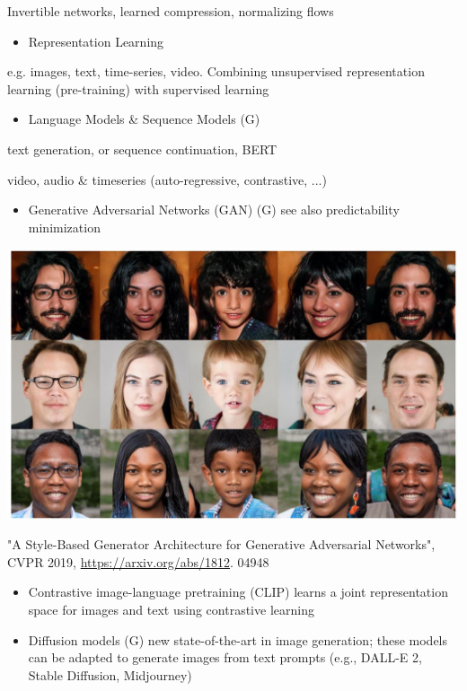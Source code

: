 \documentclass[10pt]{article}
\begin{document}
Invertible networks, learned compression, normalizing flows

\begin{itemize}
  \item Representation Learning
\end{itemize}

e.g. images, text, time-series, video. Combining unsupervised representation learning (pre-training) with supervised learning

\begin{itemize}
  \item Language Models \& Sequence Models (G)
\end{itemize}

text generation, or sequence continuation, BERT

video, audio \& timeseries (auto-regressive, contrastive, ...)

\begin{itemize}
  \item Generative Adversarial Networks (GAN) (G) see also predictability minimization
\end{itemize}

\begin{center}
\includegraphics[max width=\textwidth]{2024_01_08_e090cb7d953bac87fc33g-09}
\end{center}

"A Style-Based Generator Architecture for Generative Adversarial Networks", CVPR 2019, \href{https://arxiv.org/abs/1812}{https://arxiv.org/abs/1812}. 04948

\begin{itemize}
  \item Contrastive image-language pretraining (CLIP) learns a joint representation space for images and text using contrastive learning

  \item Diffusion models (G) new state-of-the-art in image generation; these models can be adapted to generate images from text prompts (e.g., DALL-E 2, Stable Diffusion, Midjourney)

\end{itemize}
\end{document}
